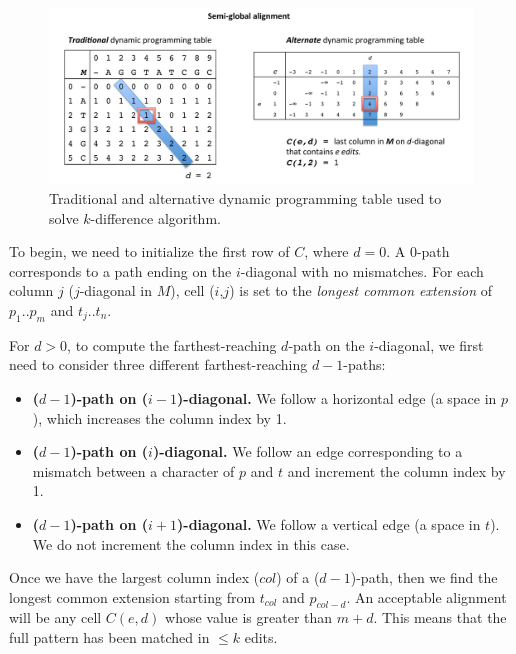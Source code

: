 \begin{figure}[tb]
  \centering
    \includegraphics[width=1.0\textwidth]{alternate_table}
  \caption{Traditional and alternative dynamic programming table used to solve $k$-difference algorithm.}
  \label{fig:alternate_table}
\end{figure}

To begin, we need to initialize the first row of $C$, where $d=0$.
A $0$-path corresponds to a path ending on the $i$-diagonal with no mismatches.
For each column $j$ ($j$-diagonal in $M$), cell ($i$,$j$) is set to the \emph{longest common extension} of $p_1..p_m$ and $t_j..t_n$.

For $d > 0$, to compute the farthest-reaching $d$-path on the $i$-diagonal, we first need to consider three different farthest-reaching $d-1$-paths:

\begin{itemize}
  \item {\bf ($d-1$)-path on ($i-1$)-diagonal.} We follow a horizontal edge (a space in $p$), which increases the column index by 1.
  \item {\bf ($d-1$)-path on ($i$)-diagonal.} We follow an edge corresponding to a mismatch between a character of $p$ and $t$ and increment the column index by 1.
  \item {\bf ($d-1$)-path on ($i+1$)-diagonal.} We follow a vertical edge (a space in $t$).  We do not increment the column index in this case.
\end{itemize}

Once we have the largest column index ($col$) of a ($d-1$)-path, then we find the longest common extension starting from $t_{col}$ and $p_{col-d}$.
An acceptable alignment will be any cell $C(e,d)$ whose value is greater than $m + d$.
This means that the full pattern has been matched in $\leq k$ edits.

